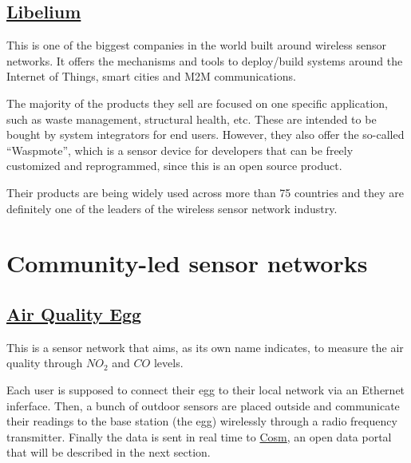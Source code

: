 \subsection{\href{http://www.libelium.com/}{Libelium}}

This is one of the biggest companies in the world built around wireless sensor networks. It offers the mechanisms and tools to deploy/build systems around the Internet of Things, smart cities and M2M communications.

The majority of the products they sell are focused on one specific application, such as waste management, structural health, etc. These are intended to be bought by system integrators for end users. However, they also offer the so-called ``Waspmote'', which is a sensor device for developers that can be freely customized and reprogrammed, since this is an open source product.

Their products are being widely used across more than 75 countries and they are definitely one of the leaders of the wireless sensor network industry.


\section{Community-led sensor networks}

%
%

\subsection{\href{http://www.aiqualityegg.com}{Air Quality Egg}}

This is a sensor network that aims, as its own name indicates, to measure the air quality through $NO_{2}$ and $CO$ levels.

Each user is supposed to connect their egg to their local network via an Ethernet inferface. Then, a bunch of outdoor sensors are placed outside and communicate their readings to the base station (the egg) wirelessly through a radio frequency transmitter. Finally the data is sent in real time to \href{http://www.cosm.com}{Cosm}, an open data portal that will be described in the next section.

